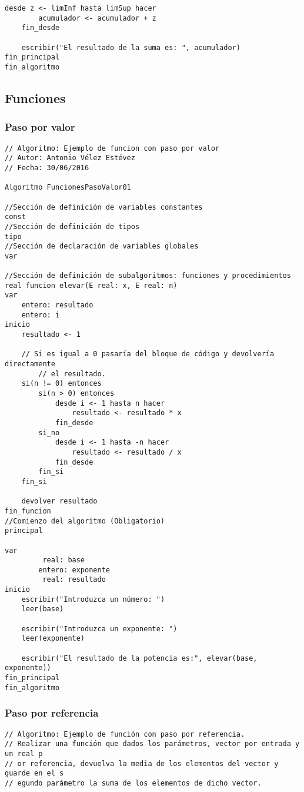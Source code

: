\documentclass{article}
\begin{document}
\begin{appendices}
\begin{lstlisting}[language = pseudocodigoesp]
	desde z <- limInf hasta limSup hacer
		acumulador <- acumulador + z
	fin_desde

	escribir("El resultado de la suma es: ", acumulador)
fin_principal
fin_algoritmo
\end{lstlisting}
\subsection{Funciones}
\subsubsection{Paso por valor}
\begin{lstlisting}[language = pseudocodigoesp, keepspaces]
// Algoritmo: Ejemplo de funcion con paso por valor
// Autor: Antonio Vélez Estévez
// Fecha: 30/06/2016
 
Algoritmo FuncionesPasoValor01

//Sección de definición de variables constantes
const 
//Sección de definición de tipos
tipo
//Sección de declaración de variables globales	
var

//Sección de definición de subalgoritmos: funciones y procedimientos	
real funcion elevar(E real: x, E real: n)
var
	entero: resultado
	entero: i
inicio
	resultado <- 1
	
	// Si es igual a 0 pasaría del bloque de código y devolvería directamente
        // el resultado.
	si(n != 0) entonces
		si(n > 0) entonces
			desde i <- 1 hasta n hacer
				resultado <- resultado * x
			fin_desde
		si_no
			desde i <- 1 hasta -n hacer
				resultado <- resultado / x
			fin_desde
		fin_si
	fin_si
	
	devolver resultado
fin_funcion
//Comienzo del algoritmo (Obligatorio)
principal	

var
         real: base
        entero: exponente
         real: resultado
inicio 	
	escribir("Introduzca un número: ")
	leer(base)
	
	escribir("Introduzca un exponente: ")
	leer(exponente)

	escribir("El resultado de la potencia es:", elevar(base, exponente))
fin_principal
fin_algoritmo
\end{lstlisting}
\subsubsection{Paso por referencia}
\begin{lstlisting}[language = pseudocodigoesp]
// Algoritmo: Ejemplo de función con paso por referencia.
// Realizar una función que dados los parámetros, vector por entrada y un real p
// or referencia, devuelva la media de los elementos del vector y guarde en el s
// egundo parámetro la suma de los elementos de dicho vector.
 

\end{lstlisting}
\end{appendices}
\end{document}
